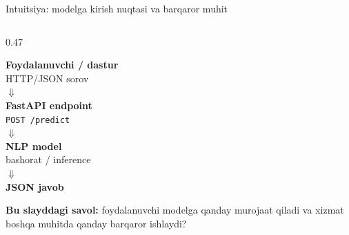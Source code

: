 \documentclass[aspectratio=169,11pt]{beamer}
\newcommand{\uzq}{\textquotesingle{}}   %
\begin{document}
\begin{frame}{Intuitsiya: modelga kirish nuqtasi va barqaror muhit}
\begin{columns}[T,totalwidth=\textwidth]
    \begin{column}{0.47\textwidth}
      \begin{tcolorbox}[okbox,title={Minimal xizmat oqimi},top=2pt,bottom=2pt,left=4pt,right=4pt]
        \centering
        \scriptsize
        \textbf{Foydalanuvchi / dastur}\\
        {\tiny HTTP/JSON so\uzq{}rov}\\[-1pt]
        $\Downarrow$\\[-1pt]
        \textbf{FastAPI endpoint}\\
        {\tiny \texttt{POST /predict}}\\[-1pt]
        $\Downarrow$\\[-1pt]
        \textbf{NLP model}\\
        {\tiny bashorat / inference}\\[-1pt]
        $\Downarrow$\\[-1pt]
        \textbf{JSON javob}
      \end{tcolorbox}

      \vspace{5pt}

      \begin{tcolorbox}[defbox,top=2pt,bottom=2pt,left=4pt,right=4pt]
        \footnotesize
        \textbf{Bu slayddagi savol:}
        foydalanuvchi modelga qanday murojaat qiladi va xizmat boshqa
        muhitda qanday barqaror ishlaydi?
      \end{tcolorbox}
    \end{column}
  \end{columns}
\end{frame}
\end{document}
